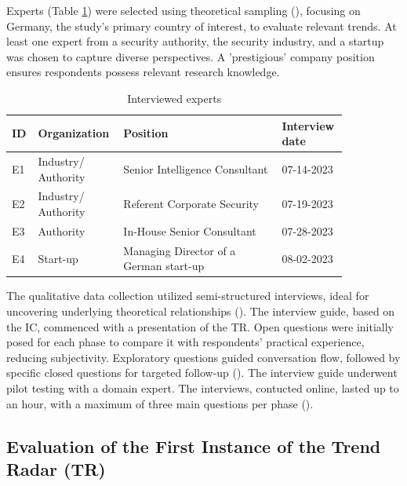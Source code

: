 \documentclass[10pt]{article}
\begin{document}
Experts (Table \ref{tab:experts}) were selected using theoretical sampling (\cite{Glaser.1967}), focusing on Germany, the study's primary country of interest, to evaluate relevant trends. At least one expert from a security authority, the security industry, and a startup was chosen to capture diverse perspectives. A 'prestigious' company position ensures respondents possess relevant research knowledge.

\begin{table}[hbtp]
    \caption{Interviewed experts}
    \begin{tabular}{p{0.05\linewidth}p{0.2\linewidth}p{0.45\linewidth}p{0.15\linewidth}}
        \toprule
        \textbf{ID} & \textbf{Organization} & \textbf{Position}                      & \textbf{Interview date} \\
        \hline
        E1          & Industry/ Authority   & Senior Intelligence Consultant         & 07-14-2023              \\
        \hline
        E2          & Industry/ Authority   & Referent Corporate Security            & 07-19-2023              \\
        \hline
        E3          & Authority             & In-House Senior Consultant             & 07-28-2023              \\
        \hline
        E4          & Start-up              & Managing Director of a German start-up & 08-02-2023              \\
        \bottomrule
    \end{tabular}
    \label{tab:experts}
\end{table}
The qualitative data collection utilized semi-structured interviews, ideal for uncovering underlying theoretical relationships (\cite{Bogner.2014}). The interview guide, based on the IC, commenced with a presentation of the TR. Open questions were initially posed for each phase to compare it with respondents' practical experience, reducing subjectivity. Exploratory questions guided conversation flow, followed by specific closed questions for targeted follow-up (\cite{Saunders.2012}). The interview guide underwent pilot testing with a domain expert. The interviews, contucted online, lasted up to an hour, with a maximum of three main questions per phase (\cite{Bogner.2014}).

\subsection{Evaluation of the First Instance of the Trend Radar (TR)}
\end{document}
